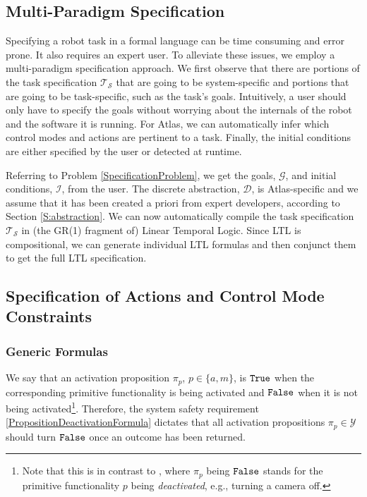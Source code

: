 
\subsection{Multi-Paradigm Specification}

Specifying a robot task in a formal language can be time consuming and error prone. It also requires an expert user.
To alleviate these issues, we employ a multi-paradigm specification approach. 
We first observe that there are portions of the task specification $\mathcal{T}_\mathcal{S}$ that are going to be system-specific and portions that are going to be task-specific, such as the task's goals.
Intuitively, a user should only have to specify the goals without worrying about the internals of the robot and the software it is running.
For Atlas, we can automatically infer which control modes and actions are pertinent to a task.
Finally, the initial conditions are either specified by the user or detected at runtime.

Referring to Problem \ref{SpecificationProblem}, we get the goals, $\mathcal{G}$, and initial conditions, $\mathcal{I}$, from the user.
The discrete abstraction, $\mathcal{D}$, is Atlas-specific and we assume that it has been created a priori from expert developers, according to Section \ref{S:abstraction}.
We can now automatically compile the task specification $\mathcal{T}_\mathcal{S}$ in (the GR(1) fragment \cite{piterman_06} of) Linear Temporal Logic.
Since LTL is compositional, we can generate individual LTL formulas and then conjunct them to get the full LTL specification.


\subsection{Specification of Actions and Control Mode Constraints}

\subsubsection{Generic Formulas}

We say that an activation proposition $\pi_p$, $p \in \{a, m\}$, is $\mathtt{True}$ when the corresponding primitive functionality is being activated and $\mathtt{False}$ when it is not being activated\footnote{Note that this is in contrast to \cite{Vasu2013ICRA}, where $\pi_p$ being $\mathtt{False}$ stands for the primitive functionality $p$ being \emph{deactivated}, e.g., turning a camera off.}.
Therefore, the system safety requirement \eqref{PropositionDeactivationFormula} dictates that all activation propositions $\pi_p \in \mathcal{Y}$ should turn $\mathtt{False}$ once an outcome has been returned.


